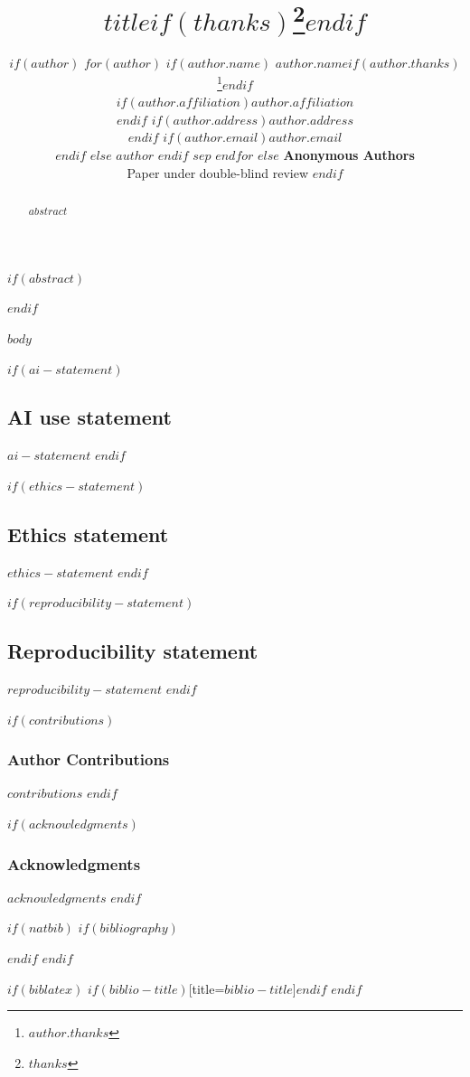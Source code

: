 \documentclass[$if(fontsize)$ $fontsize$,$endif$ $if(lang)$ $babel-lang$,$endif$ $if(papersize)$ $papersize$ paper,$endif$ $for(classoption)$ $classoption$$sep$,$endfor$]{article}
\title{$title$$if(thanks)$\thanks{$thanks$}$endif$}
\author{
$if(author)$
$for(author)$
  $if(author.name)$
    \textbf{$author.name$}$if(author.thanks)$\thanks{$author.thanks$}$endif$ \\
    $if(author.affiliation)$$author.affiliation$\\$endif$
    $if(author.address)$$author.address$\\$endif$
    $if(author.email)$\texttt{$author.email$}\\$endif$
  $else$
    \textbf{$author$}
  $endif$
  $sep$ \And
$endfor$
$else$
  \textbf{Anonymous Authors} \\
  Paper under double-blind review
$endif$
}
\begin{document}
\maketitle

$if(abstract)$
\begin{abstract}
$abstract$
\end{abstract}
$endif$

$body$

$if(ai-statement)$
\subsection*{AI use statement}
$ai-statement$
$endif$

$if(ethics-statement)$
\subsection*{Ethics statement}
$ethics-statement$
$endif$

$if(reproducibility-statement)$
\subsection*{Reproducibility statement}
$reproducibility-statement$
$endif$

$if(contributions)$
\subsubsection*{Author Contributions}
$contributions$
$endif$

$if(acknowledgments)$
\subsubsection*{Acknowledgments}
$acknowledgments$
$endif$

$if(natbib)$
$if(bibliography)$


$endif$
$endif$

$if(biblatex)$
\printbibliography$if(biblio-title)$[title=$biblio-title$]$endif$
$endif$
\end{document}
